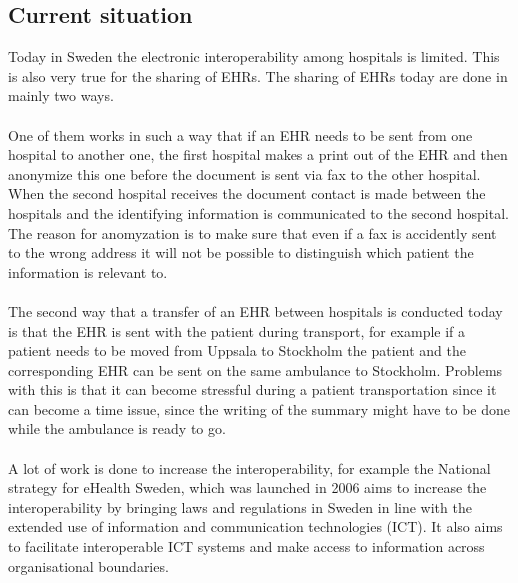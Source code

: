 \documentclass[14pt]{article}
\begin{document}
\subsection{Current situation} %
Today in Sweden the electronic \gls{interoperability} among hospitals is limited. This is also very true for the sharing of \glspl{EHR}. The sharing of \glspl{EHR} today are done in mainly two ways.
\\\\
One of them works in such a way that if an \gls{EHR} needs to be sent from one hospital to another one, the first hospital makes a print out of the \gls{EHR} and then anonymize this one before the document is sent via fax to the other hospital. When the second hospital receives the document contact is made between the hospitals and the identifying information is communicated to the second hospital.\cite{EPJ2} The reason for anomyzation is to make sure that even if a fax is accidently sent to the wrong address it will not be possible to distinguish which patient the information is relevant to.
\\\\
The second way that a transfer of an \gls{EHR} between hospitals is conducted today is that the \gls{EHR} is sent with the patient during transport, for example if a patient needs to be moved from Uppsala to Stockholm the patient and the corresponding \gls{EHR} can be sent on the same ambulance to Stockholm\cite{EPJ2}. Problems with this is that it can become stressful during a patient transportation since it can become a time issue, since the writing of the summary might have to be done while the ambulance is ready to go\cite{EPJ2}.
\\\\
A lot of work is done to increase the \gls{interoperability}, for example the National strategy for eHealth Sweden, which was launched in 2006 aims to increase the interoperability by bringing laws and regulations in Sweden in line with the extended use of information and communication technologies (ICT). It also aims to facilitate interoperable ICT systems and make access to information across organisational boundaries\cite{NationalStrategy}. 
\end{document}
